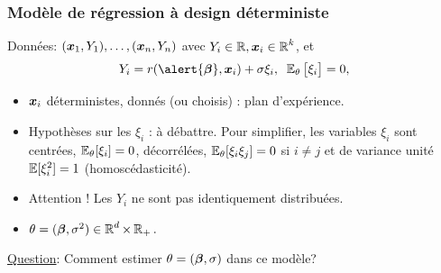 
\begin{frame}
\frametitle{Modèle de régression à design déterministe}
\begin{df}
Données: $(\operatorname{\boldsymbol{x}}_1,Y_1),\ldots, (\operatorname{\boldsymbol{x}}_n,Y_n)$ avec $Y_i \in \operatorname{{\mathbb R}}, \operatorname{\boldsymbol{x}}_i\in \operatorname{{\mathbb R}}^k$, et
$$Y_i =
r(\alert{\truebeta},\bx_i)+ \sigma \xi_i,\;\;\E_{\truetheta}\big[\xi_i\big]=0,
$$
\begin{itemize}
\item \alert<1>{$\operatorname{\boldsymbol{x}}_i$ déterministes, donnés (ou choisis) : plan d'expérience.}
\item \alert<2>{Hypothèses sur les $\xi_i$ : à débattre. \alert{Pour simplifier}, les variables $\xi_i$ sont centrées, $\operatorname{{\mathbb E}}_{\theta}[\xi_i]=0$,
décorrélées, $\operatorname{{\mathbb E}}_{\theta}[\xi_i \xi_j]= 0$ si $i \ne j$ et de variance unité $\operatorname{{\mathbb E}}[\xi_i^2]= 1$ \alert{ (homoscédasticité)}.}
\item \alert<3>{ Attention ! Les $Y_i$ ne sont pas identiquement distribuées.}
\item \alert<4>{$\theta= (\boldsymbol{\beta},\sigma^2) \in  \operatorname{{\mathbb R}}^d \times \operatorname{{\mathbb R}}_+.$}
\end{itemize}
\end{df}

\underline{Question}: Comment estimer $\theta=(\boldsymbol{\beta},\sigma)$ dans ce modèle?

\end{frame}


